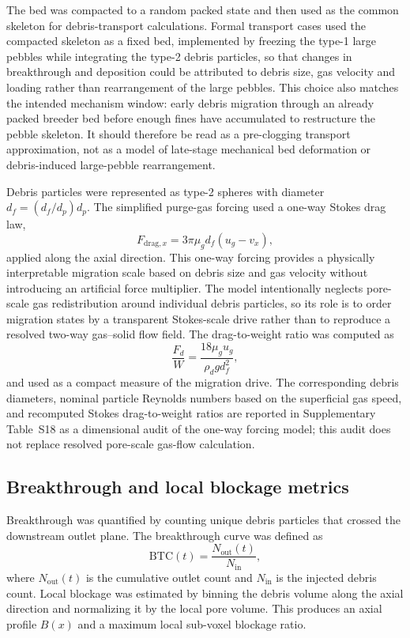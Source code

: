 \documentclass[preprint,12pt,authoryear]{elsarticle}
\begin{document}
The bed was compacted to a random packed state and then used as the common skeleton for debris-transport calculations. Formal transport cases used the compacted skeleton as a fixed bed, implemented by freezing the type-1 large pebbles while integrating the type-2 debris particles, so that changes in breakthrough and deposition could be attributed to debris size, gas velocity and loading rather than rearrangement of the large pebbles. This choice also matches the intended mechanism window: early debris migration through an already packed breeder bed before enough fines have accumulated to restructure the pebble skeleton. It should therefore be read as a pre-clogging transport approximation, not as a model of late-stage mechanical bed deformation or debris-induced large-pebble rearrangement.

Debris particles were represented as type-2 spheres with diameter $d_f = (d_f/d_p)d_p$. The simplified purge-gas forcing used a one-way Stokes drag law,
\begin{equation}
F_{\mathrm{drag},x} = 3 \pi \mu_g d_f (u_g - v_x),
\end{equation}
applied along the axial direction. This one-way forcing provides a physically interpretable migration scale based on debris size and gas velocity without introducing an artificial force multiplier. The model intentionally neglects pore-scale gas redistribution around individual debris particles, so its role is to order migration states by a transparent Stokes-scale drive rather than to reproduce a resolved two-way gas--solid flow field. The drag-to-weight ratio was computed as
\begin{equation}
\frac{F_d}{W} = \frac{18\mu_g u_g}{\rho_d g d_f^2},
\end{equation}
and used as a compact measure of the migration drive. The corresponding debris diameters, nominal particle Reynolds numbers based on the superficial gas speed, and recomputed Stokes drag-to-weight ratios are reported in Supplementary Table~S18 as a dimensional audit of the one-way forcing model; this audit does not replace resolved pore-scale gas-flow calculation.

\subsection{Breakthrough and local blockage metrics}

Breakthrough was quantified by counting unique debris particles that crossed the downstream outlet plane. The breakthrough curve was defined as
\begin{equation}
\mathrm{BTC}(t)=\frac{N_{\mathrm{out}}(t)}{N_{\mathrm{in}}},
\end{equation}
where $N_{\mathrm{out}}(t)$ is the cumulative outlet count and $N_{\mathrm{in}}$ is the injected debris count. Local blockage was estimated by binning the debris volume along the axial direction and normalizing it by the local pore volume. This produces an axial profile $B(x)$ and a maximum local sub-voxel blockage ratio.
\end{document}
